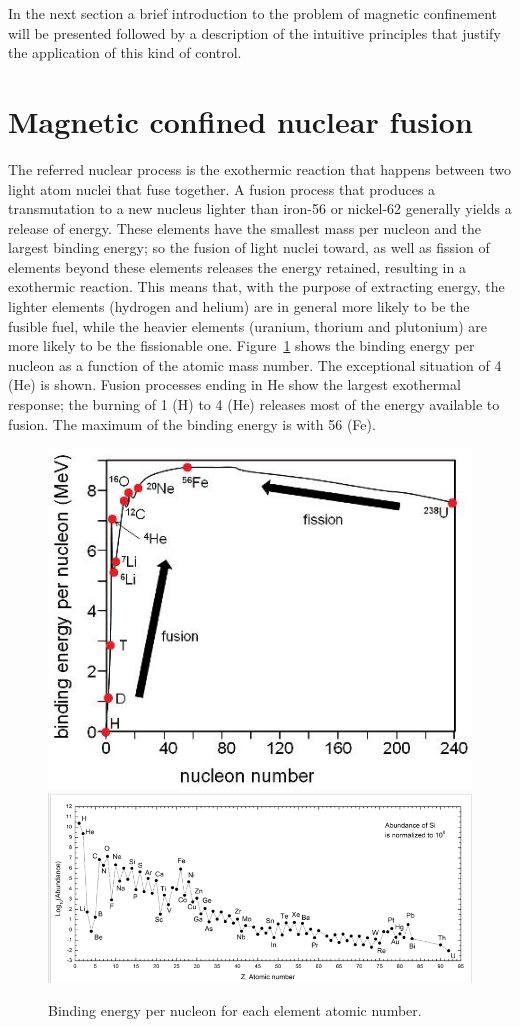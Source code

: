 In the next section a brief introduction to the problem of magnetic confinement will be presented followed by a description of the intuitive principles that justify the application of this kind of control.




\section{Magnetic confined nuclear fusion}
The referred nuclear process is the exothermic reaction that happens between two light atom nuclei that fuse together. A fusion process that produces a transmutation to a new nucleus lighter than iron-56 or nickel-62 generally yields a release of energy. These elements have the smallest mass per nucleon and the largest binding energy; so the fusion of light nuclei toward, as well as fission of elements beyond these elements releases the energy retained, resulting in a exothermic reaction.  This means that, with the purpose of extracting energy, the lighter elements (hydrogen and helium) are in general more likely to be the fusible fuel, while the heavier elements (uranium, thorium and plutonium) are more likely to be the fissionable one. 
Figure~\ref{fig:binding} shows the binding energy per nucleon as a function of the atomic mass number. The exceptional situation of 4 (He) is shown. Fusion processes ending in He show the largest exothermal response; the burning of 1 (H) to 4 (He) releases most of the energy available to fusion. The maximum of the binding energy is with 56 (Fe).
\begin{figure}[ht!]
\includegraphics[height=0.25\textwidth]{img/binding_energy.jpg} \centering
\includegraphics[height=0.25\textwidth]{img/abundance.png} \centering
\caption{Binding energy per nucleon for each element atomic number. }
\label{fig:binding}
\end{figure}

